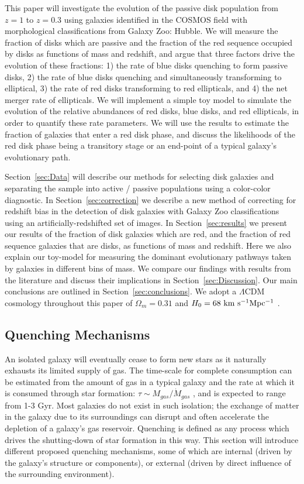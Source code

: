 This paper will investigate the evolution of the passive disk population from $z=1$ to $z=0.3$ using galaxies identified in the COSMOS field with morphological classifications from Galaxy Zoo: Hubble. We will measure the fraction of disks which are passive and the fraction of the red sequence occupied by disks as functions of mass and redshift, and argue that three factors drive the evolution of these fractions: 1) the rate of blue disks quenching to form passive disks, 2) the rate of blue disks quenching and simultaneously transforming to elliptical, 3) the rate of red disks transforming to red ellipticals, and 4) the net merger rate of ellipticals. We will implement a simple toy model to simulate the evolution of the relative abundances of red disks, blue disks, and red ellipticals, in order to quantify these rate parameters. We will use the results to estimate the fraction of galaxies that enter a red disk phase, and discuss the likelihoods of the red disk phase being a transitory stage or an end-point of a typical galaxy's evolutionary path.

Section~\ref{sec:Data} will describe our methods for selecting disk galaxies and separating the sample into active / passive populations using a color-color diagnostic. In Section~\ref{sec:correction} we describe a new method of correcting for redshift bias in the detection of disk galaxies with Galaxy Zoo classifications using an artificially-redshifted set of images. In Section~\ref{sec:results} we present our results of the fraction of disk galaxies which are red, and the fraction of red sequence galaxies that are disks, as functions of mass and redshift. Here we also explain our toy-model for measuring the dominant evolutionary pathways taken by galaxies in different bins of mass. We compare our findings with results from the literature and discuss their implications in Section~\ref{sec:Discussion}. Our main conclusions are outlined in Section~\ref{sec:conclusions}. We adopt a $\Lambda$CDM cosmology throughout this paper of $\Omega_m=0.31$ and $H_0=68~\rm km~s^{-1} Mpc^{-1}$ \citep{PlanckCollaboration2015}.


\subsection{Quenching Mechanisms}
\label{ssec:qmechs}
An isolated galaxy will eventually cease to form new stars as it naturally exhausts its limited supply of gas. The time-scale for complete consumption can be estimated from the amount of gas in a typical galaxy and the rate at which it is consumed through star formation: $\tau \sim M_{gas}/\dot{M}_{gas}$ \citep{Larson1980}, and is expected to range from 1-3 Gyr. Most galaxies do not exist in such isolation; the exchange of matter in the galaxy due to its surroundings can disrupt and often accelerate the depletion of a galaxy's gas reservoir. Quenching is defined as any process which drives the shutting-down of star formation in this way. This section will introduce different proposed quenching mechanisms, some of which are internal (driven by the galaxy's structure or components), or external (driven by direct influence of the surrounding environment). 

